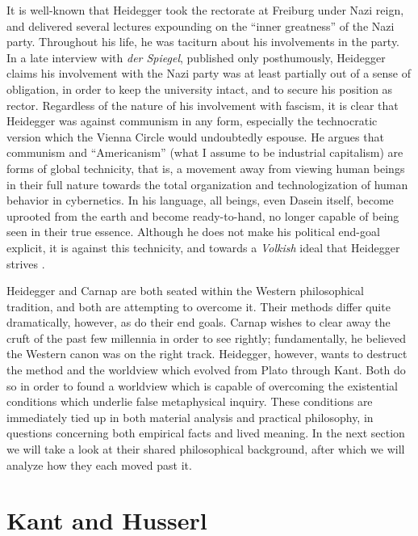 \documentclass[leqno, 12pt]{turabian-researchpaper}
\begin{document}
	It is well-known that Heidegger took the rectorate at Freiburg under Nazi
	reign, and delivered several lectures expounding on the \enquote{inner greatness}
	of the Nazi party. Throughout his life, he was taciturn about his involvements
	in the party. In a late interview with \textit{der Spiegel}, published only posthumously,
	Heidegger claims his involvement with the Nazi party was at least partially
	out of a sense of obligation, in order to keep the university intact, and to
	secure his position as rector. Regardless of the nature of his involvement with
	fascism, it is clear that Heidegger was against communism in any form, especially
	the technocratic version which the Vienna Circle would undoubtedly espouse. He
	argues that communism and \enquote{Americanism} (what I assume to be
	industrial capitalism) are forms of global technicity, that is, a movement away
	from viewing human beings in their full nature towards the total organization and
	technologization of human behavior in cybernetics. In his language, all beings,
	even Dasein itself, become uprooted from the earth and become ready-to-hand,
	no longer capable of being seen in their true essence. Although he does not make
	his political end-goal explicit, it is against this technicity, and towards a \textit{Volkish}
	ideal that Heidegger strives \autocites{heidegger1981,heidegger2008c}.

	Heidegger and Carnap are both seated within the Western philosophical tradition,
	and both are attempting to overcome it. Their methods differ quite dramatically,
	however, as do their end goals. Carnap wishes to clear away the cruft of the
	past few millennia in order to see rightly; fundamentally, he believed the
	Western canon was on the right track. Heidegger, however, wants to destruct the
	method and the worldview which evolved from Plato through Kant. Both do so in
	order to found a worldview which is capable of overcoming the existential
	conditions which underlie false metaphysical inquiry. These conditions are immediately
	tied up in both material analysis and practical philosophy, in questions
	concerning both empirical facts and lived meaning. In the next section we will
	take a look at their shared philosophical background, after which we will
	analyze how they each moved past it.

	\section{Kant and Husserl}
\end{document}
